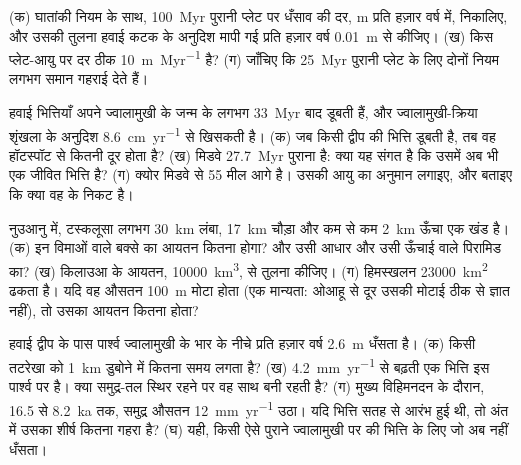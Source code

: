 \begin{exercise}[$\star\star$]\label{exo:b2:oceanic-islands:6}
(क) घातांकी नियम के साथ, \qty{100}{Myr} पुरानी प्लेट पर धँसाव की दर, \unit{m}
प्रति हज़ार वर्ष में, निकालिए, और उसकी तुलना हवाई कटक के अनुदिश मापी गई प्रति हज़ार वर्ष \qty{0.01}{m} से कीजिए।
(ख) किस प्लेट-आयु पर दर ठीक \qty{10}{m.Myr^{-1}} है? (ग) जाँचिए कि
\qty{25}{Myr} पुरानी प्लेट के लिए दोनों नियम लगभग समान गहराई देते हैं।
\end{exercise}

\begin{exercise}[$\star\star$]\label{exo:b2:oceanic-islands:7}
हवाई भित्तियाँ अपने ज्वालामुखी के जन्म के लगभग \qty{33}{Myr} बाद डूबती हैं, और ज्वालामुखी-क्रिया
शृंखला के अनुदिश \qty{8.6}{cm.yr^{-1}} से खिसकती है। (क) जब किसी द्वीप की भित्ति डूबती है, तब वह हॉटस्पॉट से
कितनी दूर होता है? (ख) मिडवे \qty{27.7}{Myr} पुराना  है: क्या यह संगत है कि उसमें अब भी एक
जीवित भित्ति है? (ग) क्योर मिडवे से 55 मील आगे है। उसकी आयु का अनुमान लगाइए, और बताइए कि क्या वह
 के निकट है।
\end{exercise}

\begin{exercise}[$\star\star$]\label{exo:b2:oceanic-islands:8}
नुउआनु  में, टस्कलूसा  लगभग \qty{30}{km} लंबा,
\qty{17}{km} चौड़ा और कम से कम \qty{2}{km} ऊँचा एक खंड है। (क) इन विमाओं वाले बक्से का आयतन
कितना होगा? और उसी आधार और उसी ऊँचाई वाले पिरामिड का? (ख) किलाउआ के आयतन,
\qty{10000}{km^3}, से तुलना कीजिए। (ग) हिमस्खलन \qty{23000}{km^2} ढकता है। यदि वह औसतन
\qty{100}{m} मोटा होता (एक मान्यता: ओआहू से दूर उसकी मोटाई ठीक से ज्ञात नहीं), तो उसका
आयतन कितना होता?
\end{exercise}

\begin{exercise}[$\star\star$]\label{exo:b2:oceanic-islands:9}
हवाई द्वीप के पास पार्श्व ज्वालामुखी के भार के नीचे प्रति हज़ार वर्ष \qty{2.6}{m} धँसता है।
(क) किसी तटरेखा को \qty{1}{km} डुबोने में कितना समय लगता है? (ख)
\qty{4.2}{mm.yr^{-1}} से बढ़ती एक भित्ति इस पार्श्व पर है। क्या समुद्र-तल स्थिर रहने पर वह साथ बनी रहती है? (ग) मुख्य
विहिमनदन के दौरान, 16.5 से \qty{8.2}{ka} तक, समुद्र औसतन \qty{12}{mm.yr^{-1}} उठा। यदि भित्ति
सतह से आरंभ हुई थी, तो अंत में उसका शीर्ष कितना गहरा है? (घ) यही, किसी ऐसे पुराने ज्वालामुखी पर की भित्ति के लिए
जो अब नहीं धँसता।
\end{exercise}

